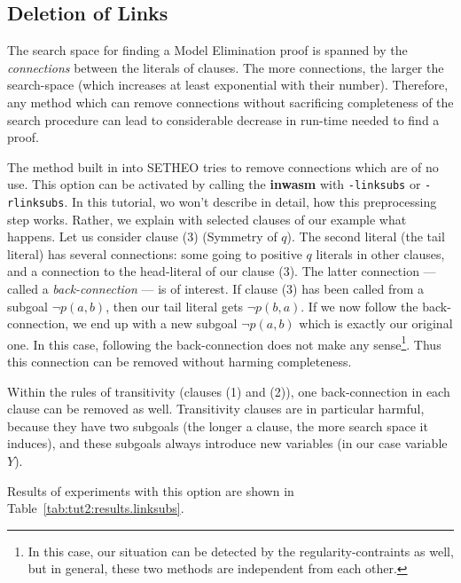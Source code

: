 \subsection{Deletion of Links}

The search space for finding a Model Elimination proof is spanned
by the {\em connections\/} between the literals of clauses. The more
connections, the larger the search-space (which increases at least
exponential with their number). Therefore, any method which can
remove connections without sacrificing completeness of the search procedure
can lead to considerable decrease in run-time needed to find a proof.

The method built in into SETHEO tries to remove connections which
are of no use. This option can be activated by calling the {\bf inwasm}
with {\tt -linksubs} or {\tt -rlinksubs}.
In this tutorial, wo won't describe in detail, how this preprocessing
step works. Rather, we explain with selected clauses of our example
what happens.
Let us consider clause (3) (Symmetry of $q$). The second literal
(the tail literal) has several connections: some going to positive
$q$ literals in other clauses, and a connection to the head-literal
of our clause (3). The latter connection --- called a {\em back-connection\/} ---
is of interest. If clause (3) has been called from a subgoal
$\neg p(a,b)$, then our tail literal gets $\neg p(b,a)$. If we now follow
the back-connection, we end up with a new subgoal $\neg p(a,b)$ which
is exactly our original one. In this case, following the back-connection
does not make any sense\footnote{
	In this case, our situation can be detected by the
	regularity-contraints as well, but in general, these
	two methods are independent from each other.
	}.
Thus this connection can be removed without
harming completeness.

Within the rules of transitivity (clauses (1) and (2)), one
back-connection in each clause can be removed as well. 
Transitivity clauses are in particular harmful, because they have two
subgoals (the longer a clause, the more search space it induces), and
these subgoals always introduce new variables (in our case variable $Y$).

Results of experiments with this option are shown in
Table~\ref{tab:tut2:results.linksubs}.

